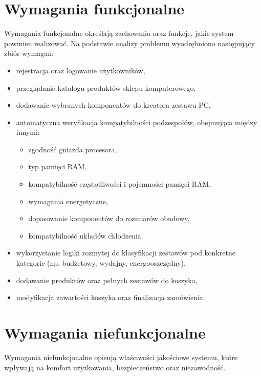 \documentclass[a4paper,twoside,12pt]{book}
\begin{document}
\section{Wymagania funkcjonalne}

Wymagania funkcjonalne określają zachowania oraz funkcje, jakie system powinien realizować. Na podstawie analizy problemu wyodrębniono następujący zbiór wymagań:

\begin{itemize}
    \item rejestracja oraz logowanie użytkowników,
    \item przeglądanie katalogu produktów sklepu komputerowego,
    \item dodawanie wybranych komponentów do kreatora zestawu PC,
    \item automatyczna weryfikacja kompatybilności podzespołów, obejmująca między innymi:
    \begin{itemize}
        \item zgodność gniazda procesora,
        \item typ pamięci RAM,
        \item kompatybilność częstotliwości i pojemności pamięci RAM,
        \item wymagania energetyczne,
        \item dopasowanie komponentów do rozmiarów obudowy,
        \item kompatybilność układów chłodzenia.
    \end{itemize}
    \item wykorzystanie logiki rozmytej do klasyfikacji zestawów pod konkretne kategorie (np. budżetowy, wydajny, energooszczędny),
    \item dodawanie produktów oraz pełnych zestawów do koszyka,
    \item modyfikacja zawartości koszyka oraz finalizacja zamówienia.
\end{itemize}
\newpage
\section{Wymagania niefunkcjonalne}

Wymagania niefunkcjonalne opisują właściwości jakościowe systemu, które wpływają na komfort użytkowania, bezpieczeństwo oraz niezawodność.
\end{document}
